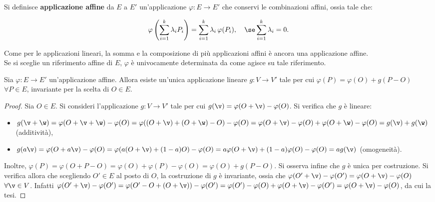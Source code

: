 \documentclass[11pt]{article}
\begin{document}
	\begin{definition}  Si definisce \textbf{applicazione affine} da $E$ a $E'$ un'applicazione $\varphi : E \to E'$
		che conservi le combinazioni affini, ossia tale che:
		
		\[ \varphi\left( \sum_{i=1}^k \lambda_i P_i \right) = \sum_{i=1}^k \lambda_i \, \varphi(P_i), \quad \se \sum_{i=1}^k \lambda_i = 0. \]
	\end{definition}
	
	\begin{remark}\nl
		\li Come per le applicazioni lineari, la somma e la composizione di più applicazioni affini è
		ancora una applicazione affine. \\
		\li Se si sceglie un riferimento affine di $E$, $\varphi$ è univocamente determinata
		da come agisce su tale riferimento.
	\end{remark}
	
	\begin{theorem}
		Sia $\varphi : E \to E'$ un'applicazione affine. Allora esiste un'unica applicazione lineare $g : V \to V'$
		tale per cui $\varphi(P) = \varphi(O) + g(P-O)$ $\forall P \in E$, invariante per la scelta di $O \in E$.
	\end{theorem}
	
	\begin{proof}
		Sia $O \in E$. Si consideri l'applicazione $g : V \to V'$ tale per cui $g(\v) = \varphi(O + \v) - \varphi(O)$.
		Si verifica che $g$ è lineare:
		
		\begin{itemize}
			\item $g(\v + \w) = \varphi(O + \v + \w) - \varphi(O) = \varphi((O + \v) + (O + \w) - O) - \varphi(O) =
			\varphi(O + \v) - \varphi(O) + \varphi(O + \w) - \varphi(O) = g(\v) + g(\w)$ (additività),
			\item $g(a\v) = \varphi(O + a\v) - \varphi(O) = \varphi(a(O + \v) + (1-a)O) - \varphi(O) =
			a\varphi(O + \v) + (1-a)\varphi(O) - \varphi(O) = ag(\v)$ (omogeneità).
		\end{itemize}
		
		Inoltre, $\varphi(P) = \varphi(O + P - O) = \varphi(O) + \varphi(P) - \varphi(O) = \varphi(O) + g(P-O)$. Si
		osserva infine che $g$ è unica per costruzione. Si
		verifica allora che scegliendo $O' \in E$ al posto di $O$, la costruzione di $g$ è invariante, ossia
		che $\varphi(O' + \v) - \varphi(O') = \varphi(O + \v) - \varphi(O)$ $\forall \v \in V$. Infatti
		$\varphi(O' + \v) - \varphi(O') = \varphi(O' - O + (O + \v)) - \varphi(O') =
		\varphi(O') - \varphi(O) + \varphi(O + \v) - \varphi(O') = \varphi(O + \v) - \varphi(O)$, da cui
		la tesi.
	\end{proof}
	
\end{document}
